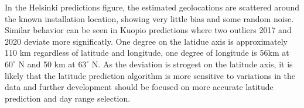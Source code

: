 In the Helsinki predictions figure, the estimated geolocations are scattered around the known installation location, showing very little bias and some random noise. Similar behavior can be seen in Kuopio predictions where two outliers 2017 and 2020 deviate more significatly. One degree on the latidue axis is approximately 110 km regardless of latitude and longitude, one degree of longitude is 56km at $60^\circ$ N and 50 km at $63^\circ$ N. As the deviation is strogest on the latitude axis, it is likely that the latitude prediction algorithm is more sensitive to variations in the data and further development should be focused on more accurate latitude prediction and day range selection.
